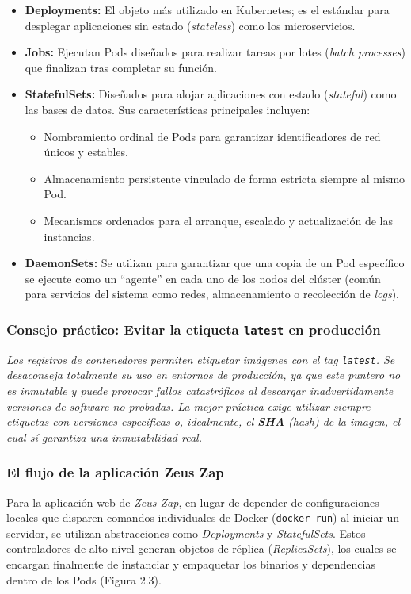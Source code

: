 \begin{itemize}
    \item \textbf{Deployments:} El objeto más utilizado en Kubernetes; es el estándar para desplegar aplicaciones sin estado (\textit{stateless}) como los microservicios.
    \item \textbf{Jobs:} Ejecutan Pods diseñados para realizar tareas por lotes (\textit{batch processes}) que finalizan tras completar su función.
    \item \textbf{StatefulSets:} Diseñados para alojar aplicaciones con estado (\textit{stateful}) como las bases de datos. Sus características principales incluyen:
    \begin{itemize}
        \item Nombramiento ordinal de Pods para garantizar identificadores de red únicos y estables.
        \item Almacenamiento persistente vinculado de forma estricta siempre al mismo Pod.
        \item Mecanismos ordenados para el arranque, escalado y actualización de las instancias.
    \end{itemize}
    \item \textbf{DaemonSets:} Se utilizan para garantizar que una copia de un Pod específico se ejecute como un ``agente'' en cada uno de los nodos del clúster (común para servicios del sistema como redes, almacenamiento o recolección de \textit{logs}).
\end{itemize}

\subsubsection*{Consejo práctico: Evitar la etiqueta \texttt{latest} en producción}
\textit{Los registros de contenedores permiten etiquetar imágenes con el tag \texttt{latest}. Se desaconseja totalmente su uso en entornos de producción, ya que este puntero no es inmutable y puede provocar fallos catastróficos al descargar inadvertidamente versiones de software no probadas. La mejor práctica exige utilizar siempre etiquetas con versiones específicas o, idealmente, el \textbf{SHA} (hash) de la imagen, el cual sí garantiza una inmutabilidad real.}

\subsubsection{El flujo de la aplicación Zeus Zap}
Para la aplicación web de \textit{Zeus Zap}, en lugar de depender de configuraciones locales que disparen comandos individuales de Docker (\texttt{docker run}) al iniciar un servidor, se utilizan abstracciones como \textit{Deployments} y \textit{StatefulSets}. Estos controladores de alto nivel generan objetos de réplica (\textit{ReplicaSets}), los cuales se encargan finalmente de instanciar y empaquetar los binarios y dependencias dentro de los Pods (Figura 2.3).

